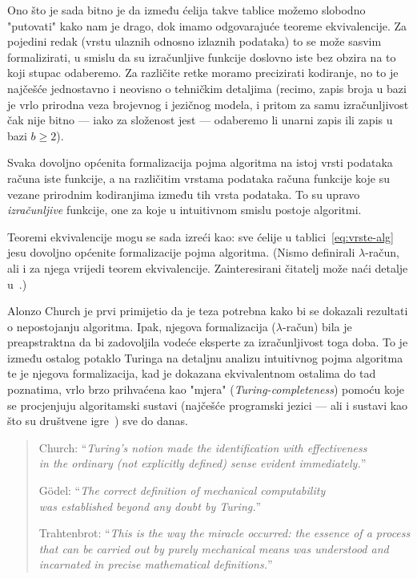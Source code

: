 Ono što je sada bitno je da između ćelija takve tablice možemo slobodno "putovati" kako nam je drago, dok imamo odgovarajuće teoreme ekvivalencije. Za pojedini redak (vrstu ulaznih odnosno izlaznih podataka) to se može sasvim formalizirati, u smislu da su izračunljive funkcije doslovno iste bez obzira na to koji stupac odaberemo. Za različite retke moramo precizirati kodiranje, no to je najčešće jednostavno i neovisno o tehničkim detaljima (recimo, zapis broja u bazi je vrlo prirodna veza brojevnog i jezičnog modela, i pritom za samu izračunljivost čak nije bitno --- iako za složenost jest --- odaberemo li unarni zapis ili zapis u bazi $b\ge2$).

\begin{ctteza}
Svaka dovoljno općenita formalizacija pojma algoritma na istoj vrsti podataka ra\-ču\-na iste funkcije, a na različitim vrstama podataka računa funkcije koje su vezane prirodnim kodiranjima između tih vrsta podataka. To su upravo \emph{izračunljive} funkcije, one za koje u intuitivnom smislu postoje algoritmi.
\end{ctteza}

Teoremi ekvivalencije mogu se sada izreći kao: sve ćelije u tablici~\eqref{eq:vrste-alg} jesu dovoljno općenite formalizacije pojma algoritma. (Nismo definirali $\lambda$-račun, ali i za njega vrijedi teorem ekvivalencije. Zainteresirani čitatelj može naći detalje u~\cite{lovnicki}.)

Alonzo Church je prvi primijetio da je teza potrebna kako bi se dokazali rezultati o nepostojanju algoritma. Ipak, njegova formalizacija ($\lambda$-račun) bila je preapstraktna da bi zadovoljila vodeće eksperte za izračunljivost toga doba. To je između ostalog potaklo Turinga na detaljnu analizu intuitivnog pojma algoritma te je njegova formalizacija, kad je dokazana ekvivalentnom ostalima do tad poznatima, vrlo brzo prihvaćena kao "mjera" (\!\emph{Turing-completeness}) pomoću koje se procjenjuju algoritamski sustavi (najčešće programski jezici --- ali i sustavi kao što su društvene igre~\cite{magicTuring}) sve do danas.

\begin{quote}
    Church: ``\!\emph{Turing's notion made the identification with effectiveness \\ in the ordinary (not explicitly defined) sense evident immediately.}''
    
    G\"odel: ``\!\emph{The correct definition of mechanical computability\\ was established beyond any doubt by Turing.}''

    Trahtenbrot: ``\!\emph{This is the way the miracle occurred: the essence of a process that can be carried out by purely mechanical means was understood and incarnated in precise mathematical definitions.}''
\end{quote}

